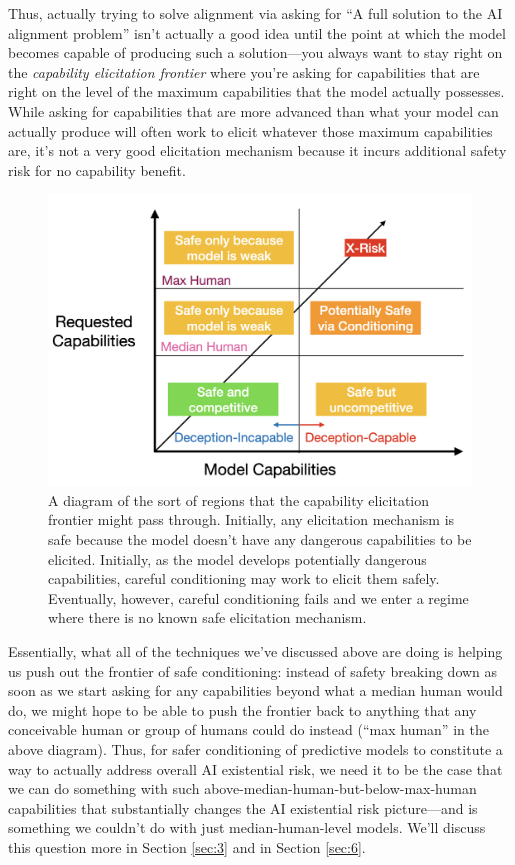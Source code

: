\documentclass[
  onecolumn,
  natbib,
]{miri-tech-article}
\begin{document}
Thus, actually trying to solve alignment via asking for ``A full solution to the AI alignment problem'' isn't actually a good idea until the point at which the model becomes capable of producing such a solution---you always want to stay right on the \textit{capability elicitation frontier} where you're asking for capabilities that are right on the level of the maximum capabilities that the model actually possesses. While asking for capabilities that are more advanced than what your model can actually produce will often work to elicit whatever those maximum capabilities are, it's not a very good elicitation mechanism because it incurs additional safety risk for no capability benefit.

\begin{figure}[h!]
  \centering
  \includegraphics[width=\textwidth]{n3TBfx6.png}
  \caption{A diagram of the sort of regions that the capability elicitation frontier might pass through. Initially, any elicitation mechanism is safe because the model doesn't have any dangerous capabilities to be elicited. Initially, as the model develops potentially dangerous capabilities, careful conditioning may work to elicit them safely. Eventually, however, careful conditioning fails and we enter a regime where there is no known safe elicitation mechanism.}
\end{figure}

Essentially, what all of the techniques we've discussed above are doing is helping us push out the frontier of safe conditioning: instead of safety breaking down as soon as we start asking for any capabilities beyond what a median human would do, we might hope to be able to push the frontier back to anything that any conceivable human or group of humans could do instead (``max human'' in the above diagram). Thus, for safer conditioning of predictive models to constitute a way to actually address overall AI existential risk, we need it to be the case that we can do something with such above-median-human-but-below-max-human capabilities that substantially changes the AI existential risk picture---and is something we couldn't do with just median-human-level models. We'll discuss this question more in Section \ref{sec:3} and in Section \ref{sec:6}.
\end{document}
